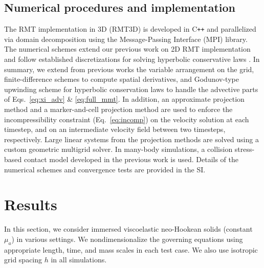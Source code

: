 \documentclass[times, 10pt]{article}
\begin{document}
\begin{multicols}{2}
\subsection*{Numerical procedures and implementation}
The RMT implementation in 3D (RMT3D) is developed in C\texttt{++} and parallelized via domain decomposition using the Message-Passing Interface (MPI) library.
The numerical schemes extend our previous work on 2D RMT implementation \cite{rycroft20}
and follow established discretizations for solving hyperbolic conservative laws \cite{almgren96, yu03}.
In summary, we extend from previous works the variable arrangement on the grid, finite-difference schemes to compute spatial derivatives,
and Godunov-type upwinding scheme for hyperbolic conservation laws \cite{colella90} to handle the advective parts of Eqs.~\eqref{eq:xi_adv} \& \eqref{eq:full_mmt}.
In addition, an approximate projection method \cite{almgren96, puckett97} and a marker-and-cell projection method
are used to enforce the incompressibility constraint (Eq.~\eqref{eq:incomp}) on the velocity solution at each timestep, and on an intermediate velocity field between two timesteps, respectively.
Large linear systems from the projection methods are solved using a custom geometric multigrid solver.
In many-body simulations, a collision stress-based contact model developed in the previous work \cite{rycroft20} is used.
Details of the numerical schemes and convergence tests are provided in the SI.

\section*{Results}
In this section, we consider immersed viscoelastic neo-Hookean solids (constant $\mu_a$) in various settings.
We nondimensionalize the governing equations using appropriate length, time, and mass scales in each test case.
We also use isotropic grid spacing $h$ in all simulations.


\end{multicols}
\end{document}

